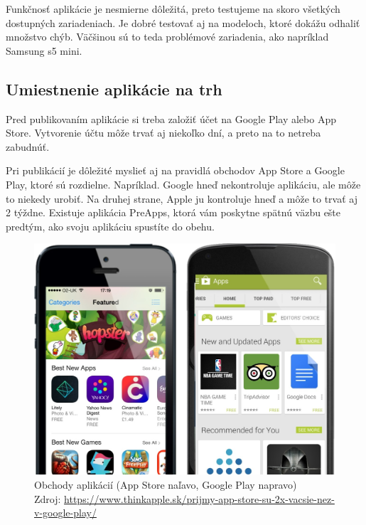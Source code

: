 \documentclass[10pt,twoside,slovak,a4paper]{article}
\begin{document}
Funkčnosť aplikácie je nesmierne dôležitá, preto testujeme na skoro všetkých dostupných zariadeniach. Je dobré testovať aj na modeloch, ktoré dokážu odhaliť množstvo chýb. Väčšinou sú to teda problémové zariadenia, ako napríklad Samsung s5 mini.

\cite{EMM2, buildfire, elite}



\subsection{Umiestnenie aplikácie na trh}
\quad Pred publikovaním aplikácie si treba založiť  účet na Google Play alebo App Store. Vytvorenie účtu môže trvať aj niekoľko dní, a preto na to netreba zabudnúť.

Pri publikácií je dôležité myslieť aj na pravidlá obchodov App Store a Google Play, ktoré sú rozdielne. Napríklad. Google hneď nekontroluje aplikáciu, ale môže to niekedy urobiť. Na druhej strane, Apple ju kontroluje hneď a môže to trvať aj 2 týždne. Existuje aplikácia PreApps, ktorá vám poskytne spätnú väzbu ešte predtým, ako svoju aplikáciu spustíte do obehu.

\begin{figure}[h!]
\includegraphics[scale=0.3]{obchod_aplikacii}
\centering
\caption{Obchody aplikácií (App Store naľavo, Google Play napravo) 
\\ Zdroj: \url{https://www.thinkapple.sk/prijmy-app-store-su-2x-vacsie-nez-v-google-play/}}
\end{figure}

\cite{EMM2}
\end{document}
